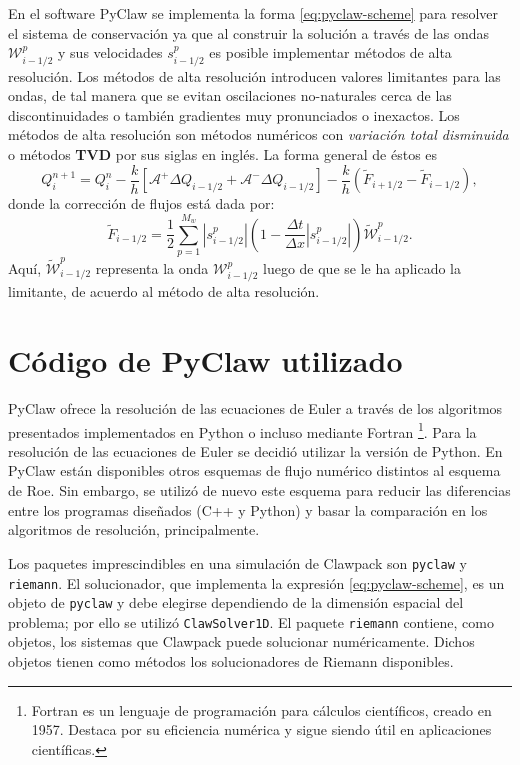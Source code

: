 En el software PyClaw se implementa la forma \eqref{eq:pyclaw-scheme} para resolver el sistema de conservación ya que al construir la solución a través de las ondas $\mathcal{W}_{i-1/2}^{p}$ y sus velocidades $s_{i-1/2}^{p}$ es posible implementar métodos de alta resolución. Los métodos de alta resolución introducen valores limitantes para las ondas, de tal manera que se evitan oscilaciones no-naturales cerca de las discontinuidades o también gradientes muy pronunciados o inexactos. Los métodos de alta resolución son métodos numéricos con \textit{variación total disminuida} o métodos \textbf{TVD} por sus siglas en inglés. La forma general de éstos es
\begin{equation}
	Q_{i}^{n+1} = Q_{i}^{n} - \frac{k}{h}\left[\mathcal{A}^{+}\Delta Q_{i-1/2} + \mathcal{A}^{-}\Delta Q_{i-1/2}\right] - \frac{k}{h}\left(\tilde{F}_{i+1/2} - \tilde{F}_{i-1/2}\right),
\end{equation}
donde la corrección de flujos está dada por:
\begin{equation}
	\tilde{F}_{i-1 / 2}=\frac{1}{2} \sum_{p=1}^{M_w}\left|s_{i-1 / 2}^p\right|\left(1-\frac{\Delta t}{\Delta x}\left|s_{i-1 / 2}^p\right|\right) \tilde{\mathcal{W}}_{i-1 / 2}^p .
\end{equation}
Aquí, $\tilde{\mathcal{W}}_{i-1 / 2}^p$ representa la onda ${\mathcal{W}}_{i-1 / 2}^p$ luego de que se le ha aplicado la limitante, de acuerdo al método de alta resolución.

\section{Código de PyClaw utilizado}
PyClaw ofrece la resolución de las ecuaciones de Euler a través de los algoritmos presentados implementados en Python o incluso mediante Fortran \footnote{Fortran es un lenguaje de programación para cálculos científicos, creado en 1957. Destaca por su eficiencia numérica y sigue siendo útil en aplicaciones científicas.}. Para la resolución de las ecuaciones de Euler se decidió utilizar la versión de Python. En PyClaw están disponibles otros esquemas de flujo numérico distintos al esquema de Roe. Sin embargo, se utilizó de nuevo este esquema para reducir las diferencias entre los programas diseñados (C++ y Python) y basar la comparación en los algoritmos de resolución, principalmente.


Los paquetes imprescindibles en una simulación de Clawpack son \texttt{pyclaw} y \texttt{riemann}. El solucionador, que implementa la expresión \eqref{eq:pyclaw-scheme}, es un objeto de \texttt{pyclaw} y debe elegirse dependiendo de la dimensión espacial del problema; por ello se utilizó \texttt{ClawSolver1D}. El paquete \texttt{riemann} contiene, como objetos, los sistemas que Clawpack puede solucionar numéricamente. Dichos objetos tienen como métodos los solucionadores de Riemann disponibles.

